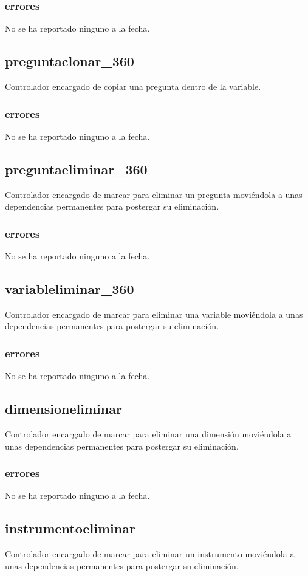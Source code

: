 \documentclass[10pt,a4paper]{book}
\begin{document}
	\subsubsection{errores}
	No se ha reportado ninguno a la fecha.
	
	\subsection{preguntaclonar\_360}
	Controlador encargado de copiar una pregunta dentro de la variable.
	\subsubsection{errores}
	No se ha reportado ninguno a la fecha.
	
	\subsection{preguntaeliminar\_360}
	Controlador encargado de marcar para eliminar un pregunta moviéndola a unas dependencias permanentes para postergar su eliminación.
	\subsubsection{errores}
	No se ha reportado ninguno a la fecha.
	
	\subsection{variableliminar\_360}
	Controlador encargado de marcar para eliminar una variable moviéndola a unas dependencias permanentes para postergar su eliminación.
	\subsubsection{errores}
	No se ha reportado ninguno a la fecha.
	
	\subsection{dimensioneliminar}
	Controlador encargado de marcar para eliminar una dimensión moviéndola a unas dependencias permanentes para postergar su eliminación.
	\subsubsection{errores}
	No se ha reportado ninguno a la fecha.
	
	\subsection{instrumentoeliminar}
	Controlador encargado de marcar para eliminar un instrumento moviéndola a unas dependencias permanentes para postergar su eliminación.
\end{document}
